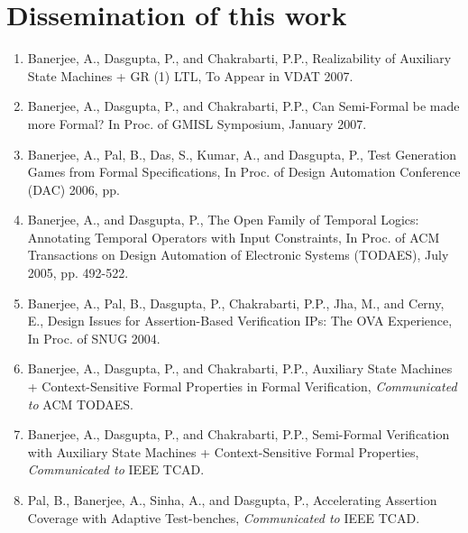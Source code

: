 \documentclass[a4paper, 11pt]{article}
\begin{document}
\newpage
\section{Dissemination of this work} \label{sec9}
\begin{enumerate}

\item Banerjee, A., Dasgupta, P., and Chakrabarti, P.P., Realizability of 
	Auxiliary State Machines + GR (1) LTL, To Appear in VDAT 2007.

\item Banerjee, A., Dasgupta, P., and Chakrabarti, P.P., 
	Can Semi-Formal be made more Formal? In Proc. of GMISL Symposium, 
	January 2007.


\item Banerjee, A., Pal, B., Das, S., Kumar, A., and Dasgupta, P., 
	Test Generation Games from Formal Specifications, In Proc. of 
	Design Automation Conference (DAC) 2006, pp. 

\item Banerjee, A., and Dasgupta, P., The Open Family of Temporal Logics: 
	Annotating Temporal Operators with Input Constraints, In Proc. of ACM 
	Transactions on Design Automation of Electronic Systems (TODAES), 
	July 2005, pp. 492-522.

\item Banerjee, A., Pal, B., Dasgupta, P., Chakrabarti, P.P., Jha, M., and 
	Cerny, E., Design Issues for Assertion-Based Verification IPs: The 
	OVA Experience, In Proc. of SNUG 2004.

\item Banerjee, A., Dasgupta, P., and Chakrabarti, P.P., Auxiliary State 
	Machines + Context-Sensitive Formal Properties in Formal 
	Verification, {\em Communicated to} ACM TODAES.

\item Banerjee, A., Dasgupta, P., and Chakrabarti, P.P., Semi-Formal 
	Verification with Auxiliary State
    Machines + Context-Sensitive Formal Properties, 
	{\em Communicated to} IEEE TCAD.


\item Pal, B., Banerjee, A., Sinha, A., and Dasgupta, P., Accelerating 
	Assertion Coverage with Adaptive Test-benches, 
	{\em Communicated to} IEEE TCAD.

\end{enumerate}
\end{document}
